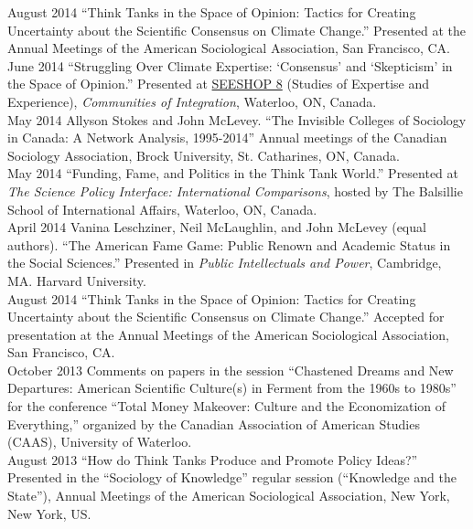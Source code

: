 \documentclass[9pt,usenames,dvipsnames]{article}
\begin{document}
\ind August 2014 ``Think Tanks in the Space of Opinion: Tactics for Creating Uncertainty about the Scientific Consensus on Climate Change.'' Presented at the Annual Meetings of the American Sociological Association, San Francisco, CA. \\

\ind June 2014 ``Struggling Over Climate Expertise: `Consensus' and `Skepticism' in the Space of Opinion.'' Presented at \href{http://www.cf.ac.uk/socsi/contactsandpeople/harrycollins/expertise-project/seeshophome.html}{SEESHOP 8} (Studies of Expertise and Experience), \emph{Communities of Integration}, Waterloo, ON, Canada. \\

\ind May 2014 Allyson Stokes and John McLevey. ``The Invisible Colleges of Sociology in Canada: A Network Analysis, 1995-2014'' Annual meetings of the Canadian Sociology Association, Brock University, St. Catharines, ON, Canada.\\

\ind May 2014 ``Funding, Fame, and Politics in the Think Tank World.'' Presented at \emph{The Science Policy Interface: International Comparisons}, hosted by The Balsillie School of International Affairs, Waterloo, ON, Canada. \\

\ind April 2014 Vanina Leschziner, Neil McLaughlin, and John McLevey (equal authors). ``The American Fame Game: Public Renown and Academic Status in the Social Sciences.'' Presented in \emph{Public Intellectuals and Power}, Cambridge, MA. Harvard University. \\

\ind August 2014 ``Think Tanks in the Space of Opinion: Tactics for Creating Uncertainty about the Scientific Consensus on Climate Change.'' Accepted for presentation at the Annual Meetings of the American Sociological Association, San Francisco, CA. \\

\ind October 2013 Comments on papers in the session ``Chastened Dreams and New Departures: American Scientific Culture(s) in Ferment from the 1960s to 1980s'' for the conference ``Total Money Makeover: Culture and the Economization of Everything,'' organized by the Canadian Association of American Studies (CAAS), University of Waterloo. \\

\ind August 2013 ``How do Think Tanks Produce and Promote Policy Ideas?'' Presented in the ``Sociology of Knowledge'' regular session (``Knowledge and the State''), Annual Meetings of the American Sociological Association, New York, New York, US. \\
\end{document}
